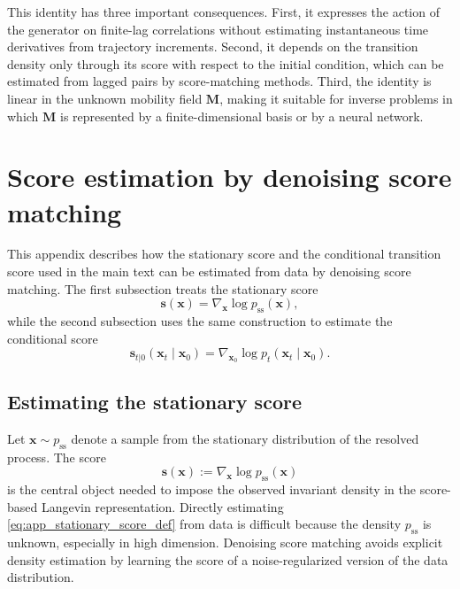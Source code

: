 \documentclass[11pt,twoside,fleqn]{article}
\begin{document}
This identity has three important consequences. First, it expresses the action of the generator on finite-lag correlations without estimating instantaneous time derivatives from trajectory increments. Second, it depends on the transition density only through its score with respect to the initial condition, which can be estimated from lagged pairs by score-matching methods. Third, the identity is linear in the unknown mobility field $\bm{M}$, making it suitable for inverse problems in which $\bm{M}$ is represented by a finite-dimensional basis or by a neural network.

\section{Score estimation by denoising score matching}
\label{app:score_estimation_dsm}

This appendix describes how the stationary score and the conditional transition score used in the main text can be estimated from data by denoising score matching. The first subsection treats the stationary score
\[
    \bm{s}(\bm{x})
    =
    \nabla_{\bm{x}}\log p_{\mathrm{ss}}(\bm{x}),
\]
while the second subsection uses the same construction to estimate the conditional score
\[
    \bm{s}_{t|0}(\bm{x}_t\mid\bm{x}_0)
    =
    \nabla_{\bm{x}_0}\log p_t(\bm{x}_t\mid\bm{x}_0).
\]

\subsection{Estimating the stationary score}
\label{app:stationary_score_dsm}

Let $\bm{x}\sim p_{\mathrm{ss}}$ denote a sample from the stationary distribution of the resolved process. The score
\begin{equation}
    \bm{s}(\bm{x})
    :=
    \nabla_{\bm{x}}\log p_{\mathrm{ss}}(\bm{x})
    \label{eq:app_stationary_score_def}
\end{equation}
is the central object needed to impose the observed invariant density in the score-based Langevin representation. Directly estimating \eqref{eq:app_stationary_score_def} from data is difficult because the density $p_{\mathrm{ss}}$ is unknown, especially in high dimension. Denoising score matching avoids explicit density estimation by learning the score of a noise-regularized version of the data distribution.
\end{document}
